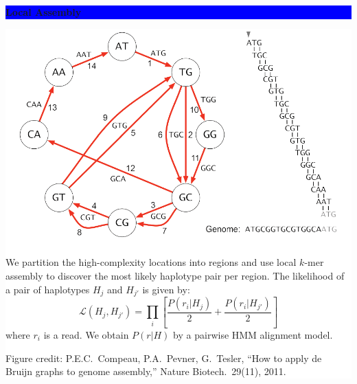 \documentclass[11pt]{a0poster}
\begin{document}
{\begin{minipage}[t][2045pt][t]{\linewidth}
\begin{minipage}{0.6\linewidth}
\vspace{75pt}
\colorbox{Blue}{
\begin{minipage}[t]{\linewidth}
\vspace{30pt}
\begin{center}
\Huge \bf \color{White} Local Assembly
\end{center}
\vspace{17pt}
\end{minipage}
}
\colorbox{White}{
\begin{minipage}[t][400pt][t]{0.3\linewidth}
\vspace{20pt}
\includegraphics[width=0.9\linewidth]{assembly-fig.pdf}
\pagebreak
\end{minipage}
\begin{minipage}[t][400pt][t]{0.7\linewidth}
\vspace{20pt}
\LARGE We partition the high-complexity locations into regions and use local
$k$-mer assembly to discover the most likely haplotype pair per region.
The likelihood of a pair of haplotypes $H_j$ and $H_{j'}$ is given by:
\large $$ \mathcal{L}(H_j,H_{j'})=\prod_i\left[ \frac{P(r_i|H_j)}{2}+\frac{P(r_i|H_{j'})}{2} \right] $$
\LARGE where $r_i$ is a read.
We obtain $P(r|H)$ by a pairwise HMM alignment model.

\small \hfill

\small Figure credit:
  P.E.C.~Compeau, P.A.~Pevner, G.~Tesler,
  ``How to apply de Bruijn graphs to genome assembly,'' Nature Biotech.~29(11), 2011.
\pagebreak
\end{minipage}
}


\end{minipage}
\end{minipage}}
\end{document}
